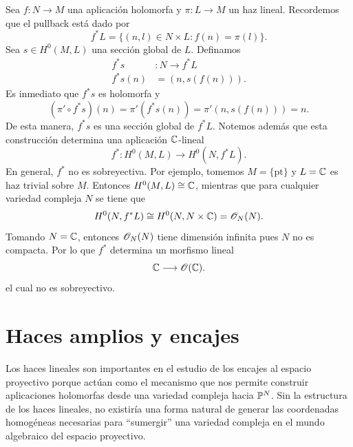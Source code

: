	\begin{example}\label{seccionespullback}
		Sea $f:N\to M$ una aplicación holomorfa y $\pi:L\to M$ un haz lineal. Recordemos que el pullback está dado por
		\begin{equation*}
			f^*L=\{(n,l)\in N\times L:f(n)=\pi(l)\}.
		\end{equation*}
		Sea $s\in H^0(M,L)$ una sección global de $L$. Definamos
		\begin{align*}
			f^*s&:N\longrightarrow f^*L\\
			f^*s(n)&=(n,s(f(n))).
		\end{align*}	
		Es inmediato que $f^*s$ es holomorfa y 
		\begin{equation*}
			(\pi'\circ f^*s)(n)=\pi'(f^*s(n))=\pi'(n,s(f(n)))=n.
		\end{equation*}
		De esta manera, $f^*s$ es una sección global de $f^*L$. Notemos además que esta construcción determina una aplicación $\mathbb{C}$-lineal
		\begin{equation*}
			f^*:H^0(M,L)\longrightarrow H^0(N,f^*L).
		\end{equation*}
		En general, $f^*$ no es sobreyectiva. Por ejemplo, tomemos $M=\{\mathrm{pt}\}$ y $L=\mathbb{C}$ es haz trivial sobre $M$. Entonces $H^0(M,L)\cong\mathbb{C}$, mientras que para cualquier variedad compleja $N$ se tiene que
		\begin{equation*}
			H^0(N,f^*L)\cong H^0(N,N\times \mathbb{C})=\mathscr{O}_N(N).
		\end{equation*} 
		Tomando $N=\mathbb{C}$, entonces $\mathscr{O}_N(N)$ tiene dimensión infinita pues $N$ no es compacta. Por lo que $f^*$ determina un morfismo lineal
		\begin{equation*}
			\mathbb{C}\longrightarrow \mathscr{O}(\mathbb{C}).
		\end{equation*}
		el cual no es sobreyectivo.
	\end{example}
	
\section{Haces amplios y encajes}

Los haces lineales son importantes en el estudio de los encajes al espacio proyectivo porque actúan como el mecanismo que nos permite construir aplicaciones holomorfas desde una variedad compleja hacia $\mathbb{P}^N$. Sin la estructura de los haces lineales, no existiría una forma natural de generar las coordenadas homogéneas necesarias para \enquote{sumergir} una variedad compleja en el mundo algebraico del espacio proyectivo. 

